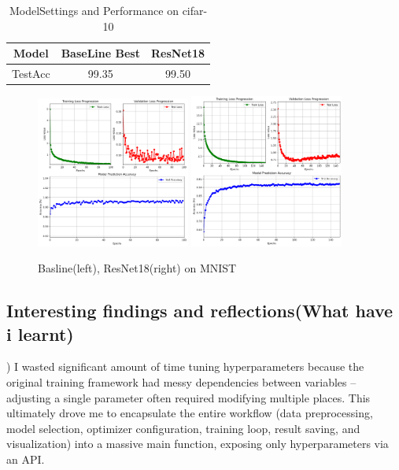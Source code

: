 \documentclass{article}
\newcommand{\subs}[1]{\subsection*{#1}}
\begin{document}
\begin{table}[htbp]
  \centering
  \caption{ModelSettings and Performance on cifar-10}
  \label{tab:model-compare}
  \begin{tabular}{|c|cc|} 
    \hline
    Model & BaseLine Best & ResNet18   \\
    \hline
    TestAcc & 99.35 & 99.50  \\
    \hline
  \end{tabular} 
\end{table}

\begin{figure}[H]
  \centering
  \includegraphics[width=0.45\textwidth]{fig/train_result_bsln_mnist.png} %
  \includegraphics[width=0.45\textwidth]{fig/train_result_res18.png} %
  \caption{Basline(left), ResNet18(right) on MNIST} %
  \label{fig:curve} %
\end{figure}



\subs{Interesting findings and reflections(What have i learnt)}
) I wasted significant amount of time tuning hyperparameters because the original training framework had messy dependencies between variables – adjusting a single parameter often required modifying multiple places. This ultimately drove me to encapsulate the entire workflow (data preprocessing, model selection, optimizer configuration, training loop, result saving, and visualization) into a massive main function, exposing only hyperparameters via an API.\\
\end{document}
